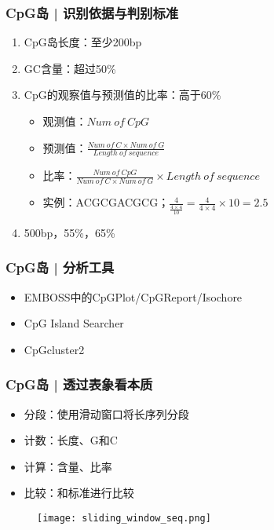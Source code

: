 \begin{frame}
  \frametitle{CpG岛 | \alert{识别依据与判别标准}}
  \begin{enumerate}
    \item CpG岛长度：至少200bp
    \item GC含量：超过50\%
    \item CpG的观察值与预测值的比率：高于60\%
      \begin{itemize}
        \item 观测值：$Num\ of\ CpG$
          \vspace{0.5em}
        \item 预测值：$\frac{Num\ of\ C \times Num\ of\ G}{Length\ of\ sequence}$
          \vspace{0.5em}
        \item 比率：$\frac{Num\ of\ CpG}{Num\ of\ C \times Num\ of\ G} \times Length\ of\ sequence$
          \vspace{0.5em}
        \item 实例：ACGCGACGCG；$\frac{4}{\frac{4\times4}{10}}=\frac{4}{4\times4}\times10=2.5$
      \end{itemize}
    \pause
    \item 500bp，55\%，65\%
  \end{enumerate}
\end{frame}

\begin{frame}
  \frametitle{CpG岛 | 分析工具}
  \begin{itemize}
    \item EMBOSS中的CpGPlot/CpGReport/Isochore
    \item CpG Island Searcher
    \item CpGcluster2
  \end{itemize}
\end{frame}

\begin{frame}
  \frametitle{CpG岛 | 透过表象看本质}
  \begin{itemize}
    \item 分段：使用滑动窗口将长序列分段
    \item 计数：长度、G和C
    \item 计算：含量、比率
    \item 比较：和标准进行比较
  \end{itemize}
  \begin{figure}
    \centering
    \texttt{[image: sliding\_window\_seq.png]}
  \end{figure}
\end{frame}


